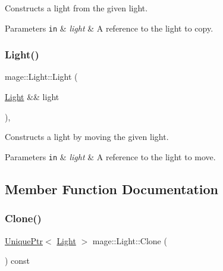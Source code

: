 Constructs a light from the given light.


\begin{DoxyParams}[1]{Parameters}
\mbox{\tt in}  & {\em light} & A reference to the light to copy. \\
\hline
\end{DoxyParams}
\hypertarget{classmage_1_1_light_a75343c11264fa27c4f166caaf0fec880}{}\label{classmage_1_1_light_a75343c11264fa27c4f166caaf0fec880} 
\subsubsection{\texorpdfstring{Light()}{Light()}\hspace{0.1cm}{\footnotesize\ttfamily [3/3]}}
{\footnotesize\ttfamily mage\+::\+Light\+::\+Light (\begin{DoxyParamCaption}\item[{\hyperlink{classmage_1_1_light}{Light} \&\&}]{light }\end{DoxyParamCaption})\hspace{0.3cm}{\ttfamily [protected]}, {\ttfamily [default]}}

Constructs a light by moving the given light.


\begin{DoxyParams}[1]{Parameters}
\mbox{\tt in}  & {\em light} & A reference to the light to move. \\
\hline
\end{DoxyParams}


\subsection{Member Function Documentation}
\hypertarget{classmage_1_1_light_a4c87e4a361b20519c49b4a0397625a6a}{}\label{classmage_1_1_light_a4c87e4a361b20519c49b4a0397625a6a} 
\subsubsection{\texorpdfstring{Clone()}{Clone()}}
{\footnotesize\ttfamily \hyperlink{namespacemage_a8c307fbcc33bce9b7f2aa4c26c3b95cf}{Unique\+Ptr}$<$ \hyperlink{classmage_1_1_light}{Light} $>$ mage\+::\+Light\+::\+Clone (\begin{DoxyParamCaption}{ }\end{DoxyParamCaption}) const}

